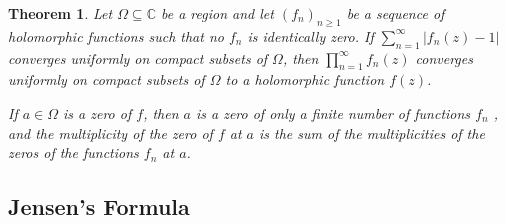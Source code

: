 \documentclass[11pt]{article}
\theoremstyle{thmstyle}
\newtheorem{theorem}{Theorem}[section]
\theoremstyle{defstyle}
\newcommand{\bbC}{\mathbb{C}}
\renewcommand{\ge}{\geqslant}
\begin{document}
\begin{theorem}
    Let $\Omega\subseteq\bbC$ be a region and let $(f_n)_{n\ge 1}$ be a sequence of holomorphic functions such that no $f_n$ is identically zero. If $\displaystyle\sum_{n = 1}^\infty |f_n(z) - 1|$ converges uniformly on compact subsets of $\Omega$, then $\displaystyle\prod_{n = 1}^\infty f_n(z)$ converges uniformly on compact subsets of $\Omega$ to a holomorphic function $f(z)$.

    If $a\in\Omega$ is a zero of $f$, then $a$ is a zero of only a finite number of functions $f_n$ , and the multiplicity of the zero of $f$ at $a$ is the sum of the multiplicities of the zeros of the functions $f_n$ at $a$.
\end{theorem}

\subsection{Jensen's Formula}
\end{document}
